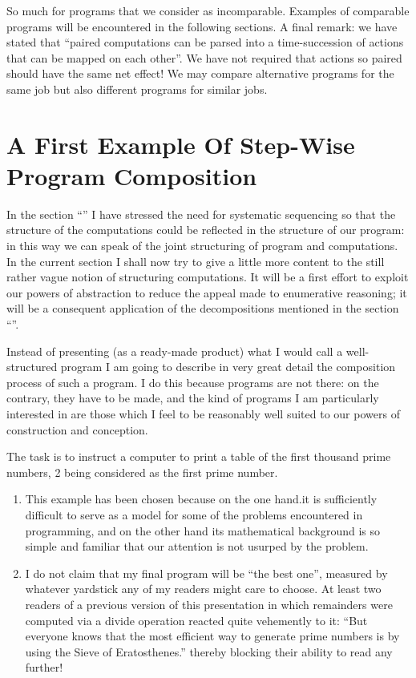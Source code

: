 So much for programs that we consider as incomparable. Examples of comparable programs will be encountered in the following sections. A final remark: we have stated that ``paired computations can be parsed into a time-succession of actions that can be mapped on each other''. We have not required that actions so paired should have the same net effect! We may compare alternative programs for the same job but also different programs for similar jobs.

\section[A first example of step-wise program composition]{A First Example Of Step-Wise Program Composition}
\label{sec:first-example-step-wise-program-composition}

In the section ``'' I have stressed the need for systematic sequencing so that the structure of the computations could be reflected in the structure of our program: in this way we can speak of the joint structuring of program and computations. In the current section I shall now try to give a little more content to the still rather vague notion of structuring computations. It will be a first effort to exploit our powers of abstraction to reduce the appeal made to enumerative reasoning; it will be a consequent application of the decompositions mentioned in the section ``''.

Instead of presenting (as a ready-made product) what I would call a well-structured program I am going to describe in very great detail the composition process of such a program. I do this because programs are not there: on the contrary, they have to be made, and the kind of programs I am particularly interested in are those which I feel to be reasonably well suited to our powers of construction and conception.

The task is to instruct a computer to print a table of the first thousand prime numbers, 2 being considered as the first prime number.

\begin{enumerate}[leftmargin=*, itemindent=2.2\parindent, label=\textit{Note }\arabic*.]
	\item This example has been chosen because on the one hand.it is sufficiently difficult to serve as a model for some of the problems encountered in programming, and on the other hand its mathematical background is so simple and familiar that our attention is not usurped by the problem.
	
	\item I do not claim that my final program will be ``the best one'', measured by whatever yardstick any of my readers might care to choose. At least two readers of a previous version of this presentation \textemdash{}  in which remainders were computed via a divide operation \textemdash{}  reacted quite vehemently to it: ``But everyone knows that the most efficient way to generate prime numbers is by using the Sieve of Eratosthenes.'' thereby blocking their ability to read any further!
\end{enumerate}

